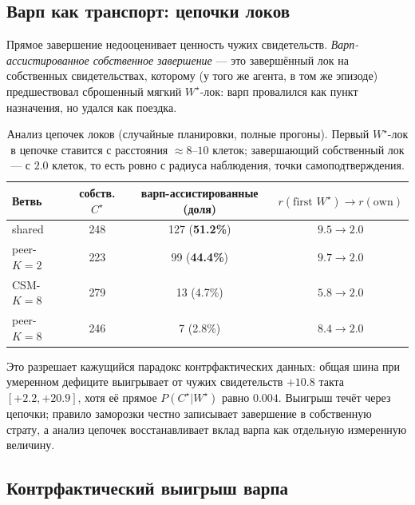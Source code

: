 \documentclass{article}
\newcommand{\wstar}{W^{\star}}
\newcommand{\cstar}{C^{\star}}
\begin{document}
\subsection{Варп как транспорт: цепочки локов}
\label{sec:taxi}

Прямое завершение недооценивает ценность чужих свидетельств.
\emph{Варп-ассистированное собственное завершение} --- это
завершённый лок на собственных свидетельствах, которому (у того же
агента, в том же эпизоде) предшествовал сброшенный мягкий
$\wstar$-лок: варп провалился как пункт назначения, но удался как
поездка.

\begin{table}[h]
\centering
\caption{Анализ цепочек локов (случайные планировки, полные прогоны).
Первый $\wstar$-лок в цепочке ставится с расстояния
${\approx}8$--$10$ клеток; завершающий собственный лок --- с $2.0$
клеток, то есть ровно с радиуса наблюдения, точки
самоподтверждения.}
\label{tab:taxi}
\small
\begin{tabular}{lccc}
\toprule
Ветвь & собств. $\cstar$ & варп-ассистированные (доля) & $r(\text{first }\wstar) \to r(\text{own})$ \\
\midrule
shared          & 248 & 127 (\textbf{51.2\%}) & $9.5 \to 2.0$ \\
peer-$K{=}2$    & 223 & 99 (\textbf{44.4\%})  & $9.7 \to 2.0$ \\
CSM-$K{=}8$     & 279 & 13 (4.7\%)            & $5.8 \to 2.0$ \\
peer-$K{=}8$    & 246 & 7 (2.8\%)             & $8.4 \to 2.0$ \\
\bottomrule
\end{tabular}
\end{table}

Это разрешает кажущийся парадокс контрфактических данных: общая шина
при умеренном дефиците выигрывает от чужих свидетельств $+10.8$ такта
$[+2.2,+20.9]$, хотя её прямое $P(\cstar|\wstar)$ равно $0.004$.
Выигрыш течёт через цепочки; правило заморозки честно записывает
завершение в собственную страту, а анализ цепочек восстанавливает
вклад варпа как отдельную измеренную величину.

\subsection{Контрфактический выигрыш варпа}
\label{sec:gain}
\end{document}
